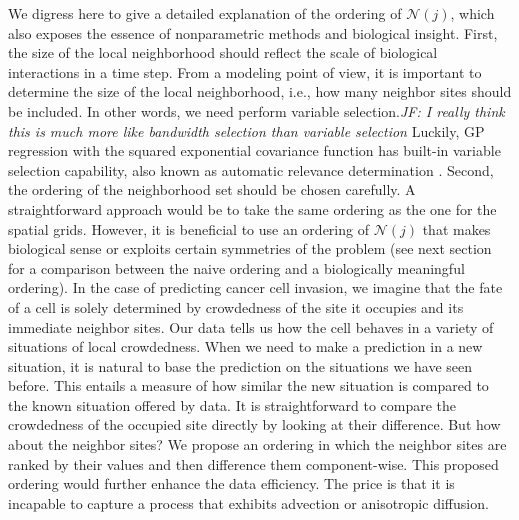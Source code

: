 \documentclass[smallextended,natbib]{svjour3}       %
\begin{document}
We digress here to give a detailed explanation of the ordering of $\mathcal{N}(j)$, which also exposes the essence of nonparametric methods and biological insight. First, the size of the local neighborhood should reflect the scale of biological interactions in a time step. From a modeling point of view, it is important to determine the size of the local neighborhood, i.e., how many neighbor sites should be included. In other words, we need perform variable selection.\emph{JF: I really think this is much more like bandwidth selection than variable selection} Luckily, GP regression with the squared exponential covariance function has built-in variable selection capability, also known as automatic relevance determination \citep{neal2012bayesian,williams1996gaussian,Rasmussen2006}. Second, the ordering of the neighborhood set should be chosen carefully. A straightforward approach would be to take the same ordering as the one for the spatial grids. However, it is beneficial to use an ordering of $\mathcal{N}(j)$ that makes biological sense or exploits certain symmetries of the problem (see next section for a comparison between the naive ordering and a biologically meaningful ordering). In the case of predicting cancer cell invasion, we imagine that the fate of a cell is solely determined by crowdedness of the site it occupies and its immediate neighbor sites. Our data tells us how the cell behaves in a variety of situations of local crowdedness. When we need to make a prediction in a new situation, it is natural to base the prediction on the situations we have seen before. This entails a measure of how similar the new situation is compared to the known situation offered by data. It is straightforward to compare the crowdedness of the occupied site directly by looking at their difference. But how about the neighbor sites? We propose an ordering in which the neighbor sites are ranked by their values and then difference them component-wise. This proposed ordering would further enhance the data efficiency. The price is that it is incapable to capture a process that exhibits advection or anisotropic diffusion. 
\end{document}
